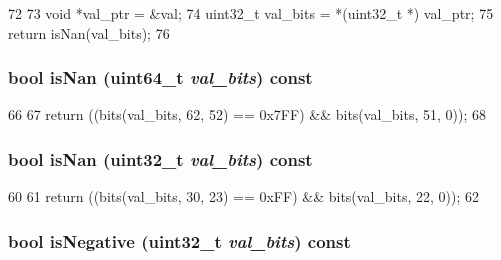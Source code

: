 \begin{DoxyCode}
72     {
73         void *val_ptr = &val;
74         uint32_t val_bits = *(uint32_t *) val_ptr;
75         return isNan(val_bits);
76     }
\end{DoxyCode}
\hypertarget{classPowerISA_1_1FloatOp_a4791bbd283b180a0b56d02210a840dc9}{
\subsubsection[{isNan}]{\setlength{\rightskip}{0pt plus 5cm}bool isNan (uint64\_\-t {\em val\_\-bits}) const}}
\label{classPowerISA_1_1FloatOp_a4791bbd283b180a0b56d02210a840dc9}



\begin{DoxyCode}
66     {
67         return ((bits(val_bits, 62, 52) == 0x7FF) && bits(val_bits, 51, 0));
68     }
\end{DoxyCode}
\hypertarget{classPowerISA_1_1FloatOp_a221eadd0925a6d2fa526bdbaaebfac93}{
\subsubsection[{isNan}]{\setlength{\rightskip}{0pt plus 5cm}bool isNan ({\bf uint32\_\-t} {\em val\_\-bits}) const}}
\label{classPowerISA_1_1FloatOp_a221eadd0925a6d2fa526bdbaaebfac93}



\begin{DoxyCode}
60     {
61         return ((bits(val_bits, 30, 23) == 0xFF) && bits(val_bits, 22, 0));
62     }
\end{DoxyCode}
\hypertarget{classPowerISA_1_1FloatOp_a1dd26f04e8ccb5902f4c888c84c630c6}{
\subsubsection[{isNegative}]{\setlength{\rightskip}{0pt plus 5cm}bool isNegative ({\bf uint32\_\-t} {\em val\_\-bits}) const}}
\label{classPowerISA_1_1FloatOp_a1dd26f04e8ccb5902f4c888c84c630c6}



